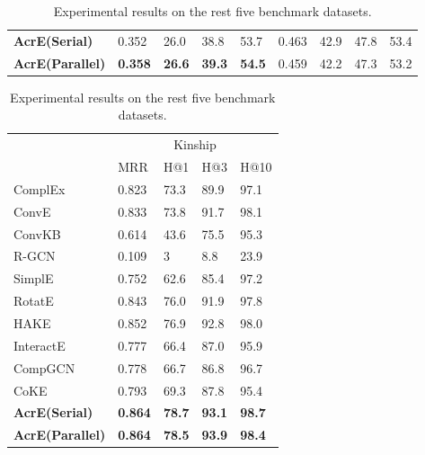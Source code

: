 \documentclass[11pt]{article}
\begin{document}
\begin{table}[thbp]
{\begin{tabular}{lllllllll}
			
\midrule
			{\bf AcrE(Serial)} &  {0.352}  & {26.0}  & {38.8}  & {53.7}    & {0.463} & {42.9}  & {47.8}    & {53.4}   \\
			{\bf AcrE(Parallel)} &  {\bf 0.358}  & {\bf 26.6}  & {\bf 39.3}  & {\bf 54.5}    & {0.459} &{42.2}  & {47.3}    & {53.2}   \\
			\hline
			
			
	\end{tabular}}
	\centering
	{\begin{tabular}{lllll}
			\multicolumn{1}{r}{} & \multicolumn{4}{c}{Kinship}  \\
			\cmidrule{2-5} 
			\multicolumn{1}{r}{} &  \multicolumn{1}{l}{MRR} & \multicolumn{1}{l}{H@1} & \multicolumn{1}{l}{H@3} & \multicolumn{1}{l}{H@10}  \\
			
			\midrule
			ComplEx{\cite{Trouillon:2016}}     & 0.823  & 73.3  & 89.9  & 97.1     \\
			ConvE{\cite{Dettmers:2018}}     & 0.833  & 73.8  & 91.7  & 98.1     \\
			ConvKB{\cite{Nguyen:2018}}     & 0.614  &43.6 & 75.5  & 95.3    \\
			R-GCN{\cite{Schlichtkrull:2018}}     &0.109 &3 &8.8 &23.9    \\
			SimplE{\cite{Kazemi:2018}}     &0.752 &62.6 &85.4 &97.2    \\
			RotatE{\cite{Sun:2019}}     &0.843 &76.0 &91.9 &97.8    \\
			HAKE{\cite{Zhang:2020}}     &0.852 &76.9 &92.8 &98.0    \\
			InteractE{\cite{Vashishth:2020a}}     &0.777 &66.4 &87.0 &95.9    \\
			CompGCN{\cite{Vashishth:2020b}}     &0.778 &66.7 &86.8 &96.7    \\
			CoKE{\cite{Wang:2020}}     &0.793 &69.3 &87.8 &95.4    \\
			\midrule
			{\bf AcrE(Serial)} &  {\bf 0.864}  & {\bf 78.7}  & {\bf 93.1}  & {\bf 98.7}     \\
			{\bf AcrE(Parallel)} &  {\bf 0.864}  & {\bf 78.5}  & {\bf 93.9}  & {\bf 98.4}     \\
\hline
			
			
	\end{tabular}}
	\caption{Experimental results on the rest five benchmark datasets.}
	\label{tab:main}\end{table}
\end{document}
